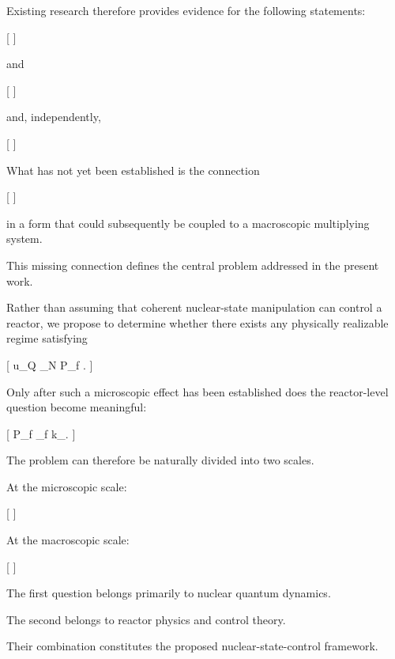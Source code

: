 Existing research therefore provides evidence for the following statements:

[
]

and

[
]

and, independently,

[
]

What has not yet been established is the connection

[
]

in a form that could subsequently be coupled to a macroscopic multiplying system.

This missing connection defines the central problem addressed in the present work.

Rather than assuming that coherent nuclear-state manipulation can control a reactor, we propose to determine whether there exists any physically realizable regime satisfying

[
u_Q
\rightarrow
\delta\rho_N
\rightarrow
\delta P_f
.
]

Only after such a microscopic effect has been established does the reactor-level question become meaningful:

[
\delta P_f
\rightarrow
\delta\Sigma_f
\rightarrow
\delta k_{}.
]

The problem can therefore be naturally divided into two scales.

At the microscopic scale:

[
]

At the macroscopic scale:

[
]

The first question belongs primarily to nuclear quantum dynamics.

The second belongs to reactor physics and control theory.

Their combination constitutes the proposed nuclear-state-control framework.
